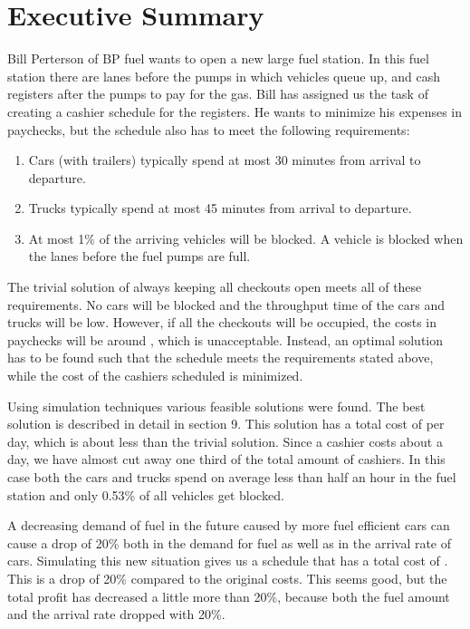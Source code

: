 \section{Executive Summary}
Bill Perterson of BP fuel wants to open a new large fuel station. In this fuel station there are lanes before the pumps in which vehicles queue up, and cash registers after the pumps to pay for the gas.  Bill has assigned us the task of creating a cashier schedule for the registers. He wants to minimize his expenses in paychecks, but the schedule also has to meet the following requirements:

\begin{enumerate}
\item Cars (with  trailers) typically spend at most 30 minutes from arrival to departure.
\item Trucks typically spend at most 45 minutes from arrival to departure.
\item At most 1$\%$ of the arriving vehicles will be blocked. A vehicle is blocked when the lanes before the fuel pumps are full.
\end{enumerate}

\noindent The trivial solution of always keeping all checkouts open meets all of these requirements. 
No cars will be blocked and the throughput time of the cars and trucks will be low.
However, if all the checkouts will be occupied, the costs in paychecks will be around , which is unacceptable.
Instead, an optimal solution has to be found such that the schedule meets the requirements stated above, while the cost of the cashiers scheduled is minimized.

\noindent Using simulation techniques various feasible solutions were found. The best solution is described in detail in section 9. 
This solution has a total cost of  per day, which is about  less than the trivial solution. 
Since a cashier costs about  a day, we have almost cut away one third of the total amount of cashiers. 
In this case both the cars and trucks spend on average less than half an hour in the fuel station and only 0.53\% of all vehicles get blocked.

\noindent A decreasing demand of fuel in the future caused by more fuel efficient cars can cause a drop of 20\% both in the demand for fuel as well as in the arrival rate of cars. Simulating this new situation gives us a schedule that has a total cost of . This is a drop of 20\% compared to the original costs. This seems good, but the total profit has decreased a little more than 20\%, because both the fuel amount and the arrival rate dropped with 20\%.